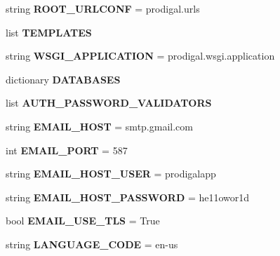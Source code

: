 \begin{DoxyCompactItemize}
string {\bfseries R\+O\+O\+T\+\_\+\+U\+R\+L\+C\+O\+NF} = \textquotesingle{}prodigal.\+urls\textquotesingle{}
\item 
list {\bfseries T\+E\+M\+P\+L\+A\+T\+ES}
\item 
\mbox{\label{namespaceprodigal_1_1settings_a0c7357b233a5c01a11808d83e124a731}} 
string {\bfseries W\+S\+G\+I\+\_\+\+A\+P\+P\+L\+I\+C\+A\+T\+I\+ON} = \textquotesingle{}prodigal.\+wsgi.\+application\textquotesingle{}
\item 
dictionary {\bfseries D\+A\+T\+A\+B\+A\+S\+ES}
\item 
list {\bfseries A\+U\+T\+H\+\_\+\+P\+A\+S\+S\+W\+O\+R\+D\+\_\+\+V\+A\+L\+I\+D\+A\+T\+O\+RS}
\item 
\mbox{\label{namespaceprodigal_1_1settings_a1d444362348e74155fe88c376e140b2f}} 
string {\bfseries E\+M\+A\+I\+L\+\_\+\+H\+O\+ST} = \textquotesingle{}smtp.\+gmail.\+com\textquotesingle{}
\item 
\mbox{\label{namespaceprodigal_1_1settings_a52834c5c44fc52e1360c43a4c831c220}} 
int {\bfseries E\+M\+A\+I\+L\+\_\+\+P\+O\+RT} = 587
\item 
\mbox{\label{namespaceprodigal_1_1settings_a44834034bbf3f47d8797d427427bdcd9}} 
string {\bfseries E\+M\+A\+I\+L\+\_\+\+H\+O\+S\+T\+\_\+\+U\+S\+ER} = \textquotesingle{}prodigalapp\textquotesingle{}
\item 
\mbox{\label{namespaceprodigal_1_1settings_aebadf9008b2078a1c035e863b1d6c54f}} 
string {\bfseries E\+M\+A\+I\+L\+\_\+\+H\+O\+S\+T\+\_\+\+P\+A\+S\+S\+W\+O\+RD} = \textquotesingle{}he11owor1d\textquotesingle{}
\item 
\mbox{\label{namespaceprodigal_1_1settings_afbd0b7e9372704c304f15dc28b8dea9e}} 
bool {\bfseries E\+M\+A\+I\+L\+\_\+\+U\+S\+E\+\_\+\+T\+LS} = True
\item 
\mbox{\label{namespaceprodigal_1_1settings_ab112656dfe11256c49f21e3191d4efdc}} 
string {\bfseries L\+A\+N\+G\+U\+A\+G\+E\+\_\+\+C\+O\+DE} = \textquotesingle{}en-\/us\textquotesingle{}
\item 

\end{DoxyCompactItemize}
